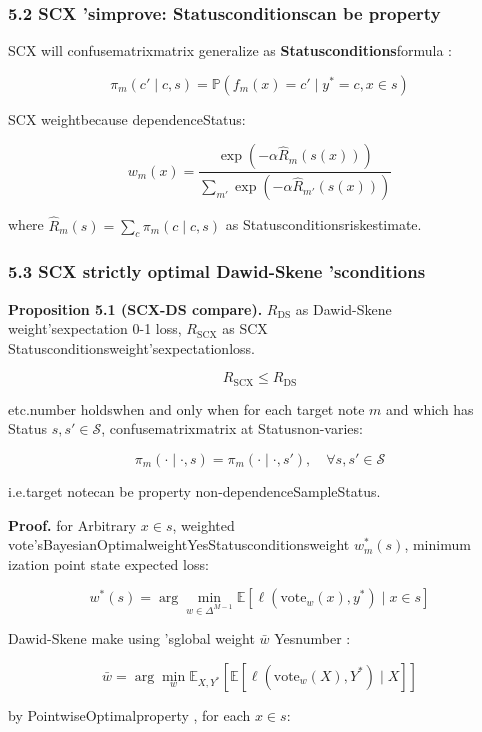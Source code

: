 \documentclass[
  12pt,
]{article}
\begin{document}
\subsubsection{5.2 SCX
'simprove: Statusconditionscan be property }\label{scx-ux7684ux6539ux8fdbux72b6ux6001ux6761ux4ef6ux53efux9760ux6027}

SCX will confusematrixmatrix generalize as \textbf{Statusconditions}formula : 

\[\pi_m(c' \mid c, s) = \mathbb{P}(f_m(x) = c' \mid y^* = c, x \in s)\]

SCX weightbecause dependenceStatus: 

\[w_m(x) = \frac{\exp(-\alpha \hat{R}_m(s(x)))}{\sum_{m'} \exp(-\alpha \hat{R}_{m'}(s(x)))}\]

where \(\hat{R}_m(s) = \sum_{c} \pi_m(c \mid c, s)\) as Statusconditionsriskestimate. 

\subsubsection{5.3 SCX strictly optimal Dawid-Skene
'sconditions}\label{scx-ux4e25ux683cux4f18ux4e8e-dawid-skene-ux7684ux6761ux4ef6}

\textbf{Proposition 5.1 (SCX-DS compare).}  \(R_{\text{DS}}\) as 
Dawid-Skene weight'sexpectation 0-1 loss, \(R_{\text{SCX}}\) as  SCX
Statusconditionsweight'sexpectationloss.

\[R_{\text{SCX}} \leq R_{\text{DS}}\]

etc.number holdswhen and only when for each target note \(m\) and which has Status
\(s, s' \in \mathcal{S}\), confusematrixmatrix at Statusnon-varies: 

\[\pi_m(\cdot \mid \cdot, s) = \pi_m(\cdot \mid \cdot, s'), \quad \forall s, s' \in \mathcal{S}\]

i.e.target notecan be property non-dependenceSampleStatus. 

\textbf{Proof.} for Arbitrary
\(x \in s\), weighted vote'sBayesianOptimalweightYesStatusconditionsweight
\(w_m^*(s)\), minimum ization point state expected loss: 

\[w^*(s) = \arg\min_{w \in \Delta^{M-1}} \mathbb{E}[\ell(\text{vote}_w(x), y^*) \mid x \in s]\]

Dawid-Skene make using 'sglobal weight \(\bar{w}\) Yesnumber : 

\[\bar{w} = \arg\min_{w} \mathbb{E}_{X, Y^*}[\mathbb{E}[\ell(\text{vote}_w(X), Y^*) \mid X]]\]

by PointwiseOptimalproperty , for each  \(x \in s\): 
\end{document}
